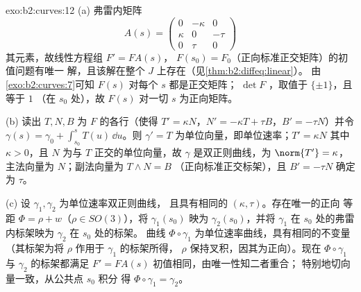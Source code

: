 \begin{solution}{exo:b2:curves:12}
(a) 弗雷内矩阵
\[
A(s) = \begin{pmatrix} 0 & -\kappa & 0\\ \kappa & 0 & -\tau\\
0 & \tau & 0\end{pmatrix}
\]
其元素，故线性方程组 $F' = FA(s)$，
$F(s_0) = F_0$（正向标准正交矩阵）的初值问题有唯一
解，且该解在整个 $J$ 上存在（见\cref{thm:b2:diffeq:linear}）。
由\cref{exo:b2:curves:7}可知 $F(s)$ 对每个 $s$ 都是正交矩阵；
$\det F$ ，取值于 $\{\pm1\}$，且等于 $1$
（在 $s_0$ 处），故 $F(s)$ 对一切 $s$ 为正向矩阵。

(b) 读出 $T, N, B$ 为 $F$ 的各行（使得 $T' = \kappa
N$，$N' = -\kappa T + \tau B$，$B' = -\tau N$）并令
$\gamma(s) = \gamma_0 + \int_{s_0}^s T(u)\,\dd u$。则
$\gamma' = T$ 为单位向量，即单位速率；$T' = \kappa N$
其中 $\kappa > 0$，且 $N$ 为与 $T$ 正交的单位向量，故 $\gamma$
是双正则曲线，为 $\norm{T'} = \kappa$，
主法向量为 $N$；副法向量为 $T \wedge N = B$
（正向标准正交标架），且 $B' = -\tau N$ 确定
为 $\tau$。

(c) 设 $\gamma_1, \gamma_2$ 为单位速率双正则曲线，
且具有相同的 $(\kappa, \tau)$。存在唯一的正向
等距 $\Phi = \rho + w$（$\rho \in SO(3)$），将
$\gamma_1(s_0)$ 映为 $\gamma_2(s_0)$，并将
$\gamma_1$ 在 $s_0$ 处的弗雷内标架映为 $\gamma_2$ 在 $s_0$ 处的标架。
曲线 $\Phi\circ\gamma_1$ 为单位速率曲线，具有相同的不变量
（其标架为将 $\rho$ 作用于 $\gamma_1$ 的标架所得，
$\rho$ 保持叉积，因其为正向）。现在
$\Phi\circ\gamma_1$ 与 $\gamma_2$ 的标架都满足 $F' =
FA(s)$ 初值相同，由唯一性知二者重合；
特别地切向量一致，从公共点 $s_0$ 积分
得 $\Phi\circ\gamma_1 = \gamma_2$。
\end{solution}

